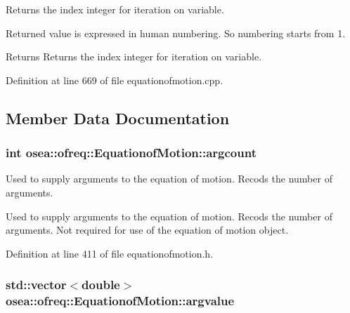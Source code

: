Returns the index integer for iteration on variable. 

Returned value is expressed in human numbering. So numbering starts from 1. \begin{DoxyReturn}{Returns}
Returns the index integer for iteration on variable. 
\end{DoxyReturn}


Definition at line 669 of file equationofmotion.\-cpp.



\subsection{Member Data Documentation}
\hypertarget{classosea_1_1ofreq_1_1_equationof_motion_a13a15811fd575ac0fccf0d463218657b}{
\subsubsection[{argcount}]{\setlength{\rightskip}{0pt plus 5cm}int osea\-::ofreq\-::\-Equationof\-Motion\-::argcount\hspace{0.3cm}{\ttfamily [protected]}}}\label{classosea_1_1ofreq_1_1_equationof_motion_a13a15811fd575ac0fccf0d463218657b}


Used to supply arguments to the equation of motion. Recods the number of arguments. 

Used to supply arguments to the equation of motion. Recods the number of arguments. Not required for use of the equation of motion object. 

Definition at line 411 of file equationofmotion.\-h.

\hypertarget{classosea_1_1ofreq_1_1_equationof_motion_a1a9bf7f3460368c102aa8d4edec9b500}{
\subsubsection[{argvalue}]{\setlength{\rightskip}{0pt plus 5cm}std\-::vector$<$double$>$ osea\-::ofreq\-::\-Equationof\-Motion\-::argvalue\hspace{0.3cm}{\ttfamily [protected]}}}\label{classosea_1_1ofreq_1_1_equationof_motion_a1a9bf7f3460368c102aa8d4edec9b500}



